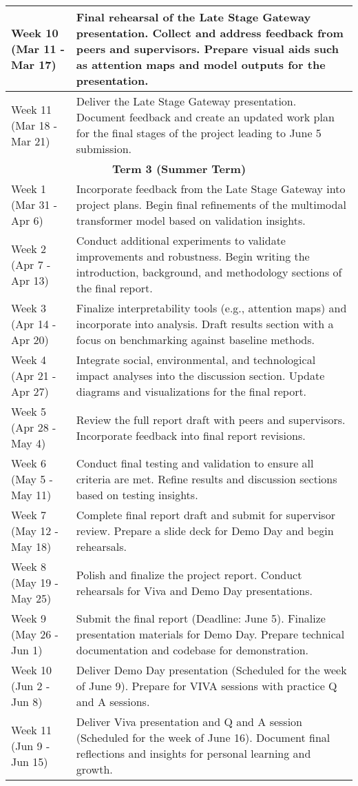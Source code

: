 \begin{longtable}{|p{2cm}|p{13cm}|}
\hline
Week 10 (Mar 11 - Mar 17) & Final rehearsal of the Late Stage Gateway presentation. Collect and address feedback from peers and supervisors. Prepare visual aids such as attention maps and model outputs for the presentation. \\
\hline
Week 11 (Mar 18 - Mar 21) & Deliver the Late Stage Gateway presentation. Document feedback and create an updated work plan for the final stages of the project leading to June 5 submission. \\
\hline
\multicolumn{2}{|c|}{\textbf{Term 3 (Summer Term)}} \\
\hline
Week 1 (Mar 31 - Apr 6) & Incorporate feedback from the Late Stage Gateway into project plans. Begin final refinements of the multimodal transformer model based on validation insights. \\
\hline
Week 2 (Apr 7 - Apr 13) & Conduct additional experiments to validate improvements and robustness. Begin writing the introduction, background, and methodology sections of the final report. \\
\hline
Week 3 (Apr 14 - Apr 20) & Finalize interpretability tools (e.g., attention maps) and incorporate into analysis. Draft results section with a focus on benchmarking against baseline methods. \\
\hline
Week 4 (Apr 21 - Apr 27) & Integrate social, environmental, and technological impact analyses into the discussion section. Update diagrams and visualizations for the final report. \\
\hline
Week 5 (Apr 28 - May 4) & Review the full report draft with peers and supervisors. Incorporate feedback into final report revisions. \\
\hline
Week 6 (May 5 - May 11) & Conduct final testing and validation to ensure all criteria are met. Refine results and discussion sections based on testing insights. \\
\hline
Week 7 (May 12 - May 18) & Complete final report draft and submit for supervisor review. Prepare a slide deck for Demo Day and begin rehearsals. \\
\hline
Week 8 (May 19 - May 25) & Polish and finalize the project report. Conduct rehearsals for Viva and Demo Day presentations. \\
\hline
Week 9 (May 26 - Jun 1) & Submit the final report (Deadline: June 5). Finalize presentation materials for Demo Day. Prepare technical documentation and codebase for demonstration. \\
\hline
Week 10 (Jun 2 - Jun 8) & Deliver Demo Day presentation (Scheduled for the week of June 9). Prepare for VIVA sessions with practice Q and A sessions. \\
\hline
Week 11 (Jun 9 - Jun 15) & Deliver Viva presentation and Q and A session (Scheduled for the week of June 16). Document final reflections and insights for personal learning and growth. \\
\hline
\end{longtable}

